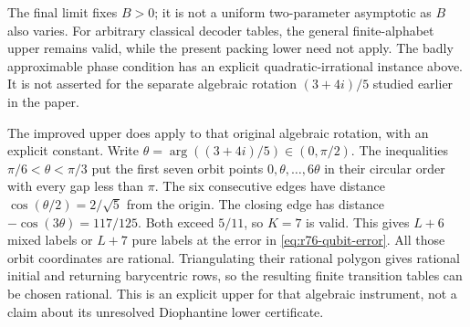 The final limit fixes $B>0$; it is not a uniform two-parameter asymptotic
as $B$ also varies.  For arbitrary classical decoder tables, the general
finite-alphabet upper remains valid, while the present packing lower
need not apply.  The badly approximable phase condition has an explicit
quadratic-irrational instance above.  It is not asserted for the separate
algebraic rotation $(3+4i)/5$ studied earlier in the paper.

The improved upper does apply to that original algebraic rotation, with
an explicit constant.  Write $\theta=\arg((3+4i)/5)\in(0,\pi/2)$.
The inequalities $\pi/6<\theta<\pi/3$ put the first seven orbit points
$0,\theta,\ldots,6\theta$ in their circular order with every gap less
than $\pi$.  The six consecutive edges have distance
$\cos(\theta/2)=2/\sqrt5$ from the origin.  The closing edge has
distance $-\cos(3\theta)=117/125$.  Both exceed $5/11$, so $K=7$ is
valid.  This gives $L+6$ mixed labels or $L+7$ pure labels at the error
in \eqref{eq:r76-qubit-error}.  All those orbit coordinates are rational.
Triangulating their rational polygon gives rational initial and returning
barycentric rows, so the resulting finite transition tables can be chosen
rational.  This is an explicit upper for that algebraic instrument, not
a claim about its unresolved Diophantine lower certificate.

